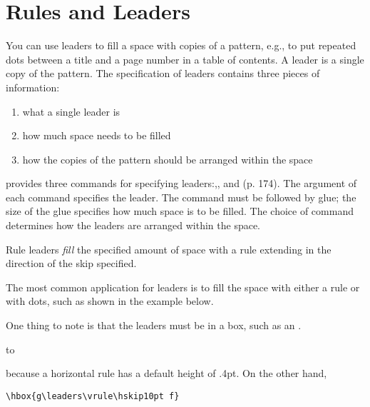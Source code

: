 \chapter{Rules and Leaders}

You can use leaders to fill a space with copies of a pattern,
e.g., to put repeated dots between a title and a page number in a table
of contents. A leader is a single copy of the pattern. The specification of
leaders contains three pieces of information:

\begin{enumerate}
\item  what a single leader is
\item  how much space needs to be filled
\item  how the copies of the pattern should be arranged within the space
\end{enumerate}

\tex  provides three commands for specifying leaders:,,
and (p. 174). The argument of each command specifies the
leader. The command must be followed by glue; the size of the glue specifies
how much space is to be filled. The choice of command determines how
the leaders are arranged within the space.

Rule leaders \textit{fill} the specified amount of space with a rule extending in the direction of the skip
specified. 

The most common application for leaders is to fill the space with either a rule or with dots, such as shown in the example below.


One thing to note is that the leaders must be in a box, such as an .

\hbox to 

because a horizontal rule has a default height of .4pt. On the other hand,

\verb+\hbox{g\leaders\vrule\hskip10pt f}+

